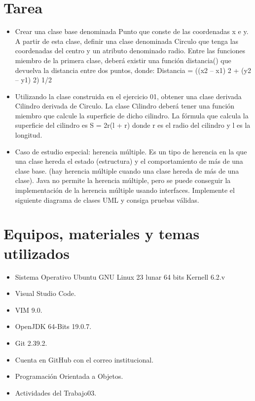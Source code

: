 \documentclass{article}
\begin{document}
	\section{Tarea}
	\begin{itemize}		
        \item Crear una clase base denominada Punto que conste de las coordenadas x e y. A
		partir de esta clase, definir una clase denominada Circulo que tenga las coordenadas del
		centro y un atributo denominado radio. Entre las funciones miembro de la primera clase,
		deberá existir una función distancia() que devuelva la distancia entre dos puntos, donde:
		Distancia = ((x2 – x1) 2 + (y2 – y1) 2) 1/2
        \item Utilizando la clase construida en el ejercicio 01, obtener una clase derivada
		Cilindro derivada de Circulo. La clase Cilindro deberá tener una función miembro que calcule
		la superficie de dicho cilindro. La fórmula que calcula la superficie del cilindro es S = 2r(l + r)
		donde r es el radio del cilindro y l es la longitud.
        \item Caso de estudio especial: herencia múltiple. Es un tipo de herencia en la que una
		clase hereda el estado (estructura) y el comportamiento de más de una clase base. (hay
		herencia múltiple cuando una clase hereda de más de una clase). Java no permite la herencia
		múltiple, pero se puede conseguir la implementación de la herencia múltiple usando
		interfaces. Implemente el siguiente diagrama de clases UML y consiga pruebas válidas.
		\end{itemize}

	\section{Equipos, materiales y temas utilizados}
	\begin{itemize}
		\item Sistema Operativo Ubuntu GNU Linux 23 lunar 64 bits Kernell 6.2.v
		\item Visual Studio Code.
		\item VIM 9.0.
		\item OpenJDK 64-Bits 19.0.7.
		\item Git 2.39.2.
		\item Cuenta en GitHub con el correo institucional.
		\item Programación Orientada a Objetos.
		\item Actividades del Trabajo03.	
	\end{itemize}
	
\end{document}
